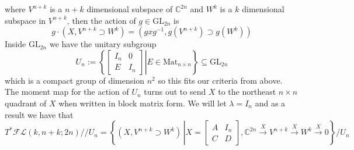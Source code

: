 \documentclass[12pt]{amsart}
\numberwithin{equation}{section}
\theoremstyle{definition}
\numberwithin{figure}{section}
\newcommand{\C}{\mathbb{C}}
\newcommand{\fl}{\mathcal{FL}}
\newcommand{\gl}{\mathrm{GL}}
\newcommand{\set}[1]{\left\{ #1 \right\}}
\begin{document}
where $V^{n+k}$ is a $n+k$ dimensional subspace of $\C^{2n}$ and $W^k$ is a $k$ dimensional subspace in $V^{n+k}$, then the action of $g\in \gl_{2n}$ is
\begin{equation}
\label{actioneq}
g\cdot( X, V^{n+k}\supset W^k)=(gxg^{-1}, g( V^{n+k})\supset g(W^k)) 
\end{equation}  
Inside $\gl_{2n}$ we have the unitary subgroup 
\[ U_n:=\left\{ \left.\begin{bmatrix}
I_n & 0 \\
E & I_n
\end{bmatrix} \right\vert  E\in \mathrm{Mat}_{n\times n}  \right\} \subseteq \gl_{2n}\]
which is a compact group of dimension $n^2$ so this fits our criteria from above. The moment map for the action of $U_n$ turns out to send $X$ to the northeast $n\times n$ quadrant of $X$ when written in block matrix form. We will let $\lambda=I_n$ and as a result we have that
\[  T^*\fl(k,  n+k; 2n)//U_n= \set{(X, V^{n+k}\supset W^k)\, \left \vert  X=\begin{bmatrix}
A & I_n \\
C & D
\end{bmatrix},  \C^{2n}\xrightarrow{X} V^{n+k}\xrightarrow{X}W^k\xrightarrow{X} 0 \right.} /U_n \]
\end{document}
